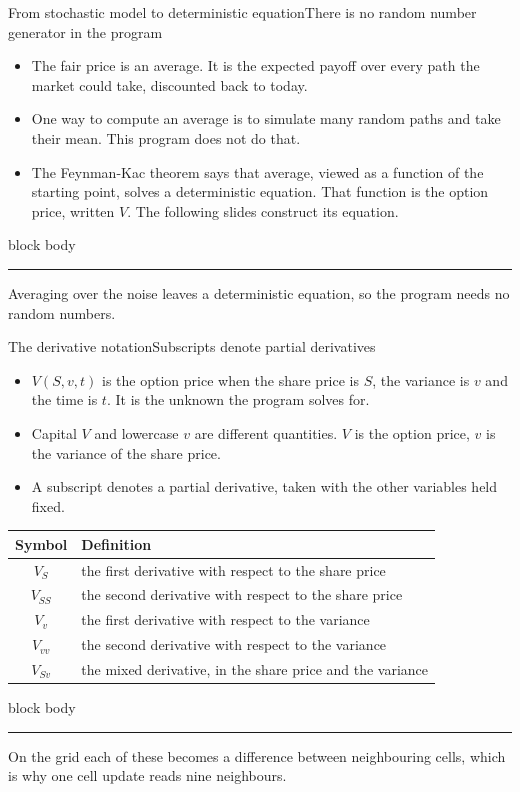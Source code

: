 \documentclass[aspectratio=169,11pt]{beamer}
\newcommand{\sigcallout}[1]{%
  \vfill
  \begin{beamercolorbox}[wd=\linewidth,sep=0.7em,rounded=true]{block body}
    {\color{sigblue}\rule{0.9ex}{0.9ex}}\hspace{0.5em}#1
  \end{beamercolorbox}%
}
\newcommand{\sigtable}[3]{%
  \begingroup
  \renewcommand{\arraystretch}{1.15}%
  \begin{table}\small
    \begin{tabular}{#1}
      \toprule
      #2 \\
      \midrule
      #3
      \bottomrule
    \end{tabular}
  \end{table}%
  \endgroup
}
\begin{document}
\begin{frame}{From stochastic model to deterministic equation}{There is no random number generator in the program}
  \begin{itemize}
    \item The fair price is an average. It is the expected payoff over
      every path the market could take, discounted back to today.
    \item One way to compute an average is to simulate many random paths
      and take their mean. This program does not do that.
    \item The Feynman-Kac theorem says that average, viewed as a function
      of the starting point, solves a deterministic equation. That
      function is the option price, written $V$. The following slides
      construct its equation.
  \end{itemize}
  \sigcallout{Averaging over the noise leaves a deterministic equation, so
    the program needs no random numbers.}
\end{frame}

\begin{frame}{The derivative notation}{Subscripts denote partial derivatives}
  \begin{itemize}
    \item $V(S, v, t)$ is the option price when the share price is $S$,
      the variance is $v$ and the time is $t$. It is the unknown the
      program solves for.
    \item Capital $V$ and lowercase $v$ are different quantities. $V$ is
      the option price, $v$ is the variance of the share price.
    \item A subscript denotes a partial derivative, taken with the other
      variables held fixed.
  \end{itemize}
  \sigtable{cl}{\textbf{Symbol} & \textbf{Definition}}{%
    $V_S$ & the first derivative with respect to the share price \\
    $V_{SS}$ & the second derivative with respect to the share price \\
    $V_v$ & the first derivative with respect to the variance \\
    $V_{vv}$ & the second derivative with respect to the variance \\
    $V_{Sv}$ & the mixed derivative, in the share price and the variance \\}
  \sigcallout{On the grid each of these becomes a difference between
    neighbouring cells, which is why one cell update reads nine neighbours.}
\end{frame}
\end{document}
